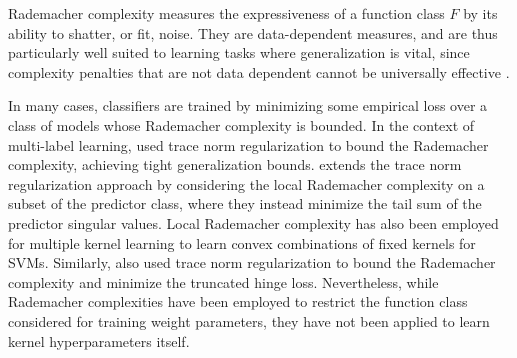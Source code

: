 \documentclass[twoside]{article}
\begin{document}
			Rademacher complexity \citep{bartlett2002rademacher} measures the expressiveness of a function class $F$ by its ability to shatter, or fit, noise. They are data-dependent measures, and are thus particularly well suited to learning tasks where generalization is vital, since complexity penalties that are not data dependent cannot be universally effective \citep{kearns1997experimental}. 
	
			In many cases, classifiers are trained by minimizing some empirical loss over a class of models whose Rademacher complexity is bounded. In the context of multi-label learning, \cite{yu2014large} used trace norm regularization to bound the Rademacher complexity, achieving tight generalization bounds. \cite{xu2016local} extends the trace norm regularization approach by considering the local Rademacher complexity on a subset of the predictor class, where they instead minimize the tail sum of the predictor singular values. Local Rademacher complexity has also been employed for multiple kernel learning \citep{kloft2011local, cortes2013learning} to learn convex combinations of fixed kernels for \glspl{SVM}. Similarly, \cite{pontil2013excess} also used trace norm regularization to bound the Rademacher complexity and minimize the truncated hinge loss. Nevertheless, while Rademacher complexities have been employed to restrict the function class considered for training weight parameters, they have not been applied to learn kernel hyperparameters itself.
	
	
\end{document}
